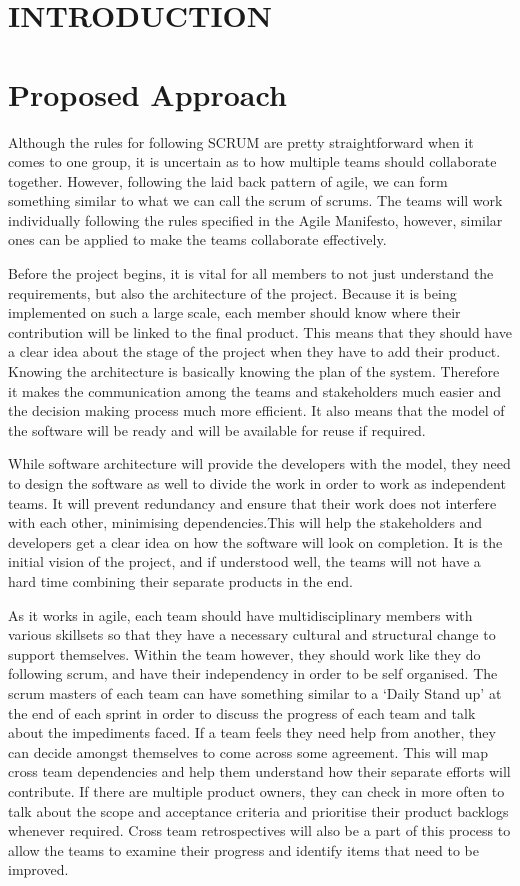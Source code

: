 \documentclass[sigconf]{acmart}
\begin{document}
\section{INTRODUCTION}

\section{Proposed Approach}
Although the rules for following SCRUM are pretty straightforward when it comes to one group, it is uncertain as to how multiple teams should collaborate together. 
However, following the laid back pattern of agile, we can form something similar to what we can call the scrum of scrums. The teams will work individually following the rules specified in the Agile Manifesto, however, similar ones can be applied to make the teams collaborate effectively. 

Before the project begins, it is vital for all members to not just understand the requirements, but also the architecture of the project. Because it is being implemented on such a large scale, each member should know where their contribution will be linked to the final product. This means that they should have a clear idea about the stage of the project when they have to add their product. Knowing the architecture is basically knowing the plan of the system. Therefore it makes the communication among the teams and stakeholders much easier and the decision making process much more efficient. It also means that the model of the software will be ready and will be available for reuse if required. 

While software architecture will provide the developers with the model, they need to design the software as well to divide the work in order to work as independent teams. It will prevent redundancy and ensure that their work does not interfere with each other, minimising dependencies.This will help the stakeholders and developers get a clear idea on how the software will look on completion. It is the initial vision of the project, and if understood well, the teams will not have a hard time combining their separate products in the end.

As it works in agile, each team should have multidisciplinary members with various skillsets so that they have a necessary cultural and structural change to support themselves. Within the team however, they should work like they do following scrum, and have their independency in order to be self organised. The scrum masters of each team can have something similar to a ‘Daily Stand up’ at the end of each sprint in order to discuss the progress of each team and talk about the impediments faced. If a team feels they need help from another, they can decide amongst themselves to come across some agreement. This will map cross team dependencies and help them understand how their separate efforts will contribute. If there are multiple product owners, they can check in more often to talk about the scope and acceptance criteria and prioritise their product backlogs whenever required. Cross team retrospectives will also be a part of this process to allow the teams to examine their progress and identify items that need to be improved.  
\end{document}
